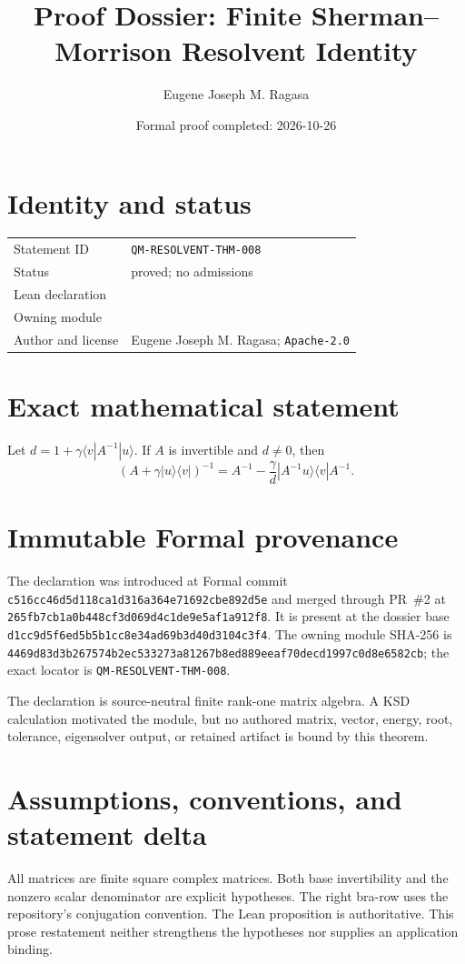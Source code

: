 \documentclass[11pt]{article}
\title{Proof Dossier: Finite Sherman--Morrison Resolvent Identity}
\author{Eugene Joseph M. Ragasa}
\date{Formal proof completed: 2026-10-26}
\begin{document}
\raggedright
\maketitle

\section{Identity and status}
\begin{tabularx}{\textwidth}{@{}lY@{}}
\toprule
Statement ID & \texttt{QM-RESOLVENT-THM-008} \\
Status & proved; no admissions \\
Lean declaration &  \\
Owning module &  \\
Author and license & Eugene Joseph M. Ragasa; \texttt{Apache-2.0} \\
\bottomrule
\end{tabularx}

\section{Exact mathematical statement}
Let $d=1+\gamma\langle v|A^{-1}|u\rangle$.  If $A$ is invertible and $d\ne0$, then
\[
 (A+\gamma|u\rangle\langle v|)^{-1}
 =A^{-1}-\frac{\gamma}{d}
   |A^{-1}u\rangle\langle v|A^{-1}.
\]

\section{Immutable Formal provenance}
The declaration was introduced at Formal commit
\texttt{c516cc46d5d118ca1d316a364e71692cbe892d5e} and merged through PR~\#2 at
\texttt{265fb7cb1a0b448cf3d069d4c1de9e5af1a912f8}.  It is present at the dossier base
\texttt{d1cc9d5f6ed5b5b1cc8e34ad69b3d40d3104c3f4}.  The owning module SHA-256 is
\texttt{4469d83d3b267574b2ec533273a81267b8ed889eeaf70decd1997c0d8e6582cb}; the exact locator is \texttt{QM-RESOLVENT-THM-008}.

The declaration is source-neutral finite rank-one matrix algebra.  A KSD calculation motivated the module, but no authored matrix, vector, energy, root, tolerance, eigensolver output, or retained artifact is bound by this theorem.

\section{Assumptions, conventions, and statement delta}
All matrices are finite square complex matrices.  Both base invertibility and the nonzero scalar denominator are explicit hypotheses.  The right bra-row uses the repository's conjugation convention.
The Lean proposition is authoritative.  This prose restatement neither strengthens the hypotheses
nor supplies an application binding.
\end{document}
